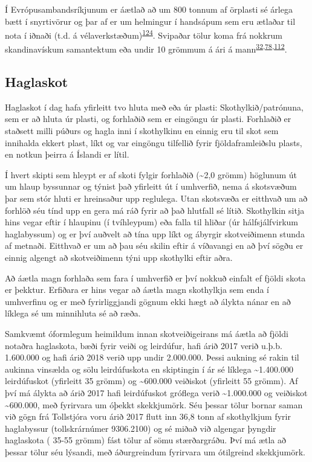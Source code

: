 \documentclass[icelandic,]{book}
\begin{document}
Í Evrópusambandsríkjunum er áætlað að um 800 tonnum af örplasti sé árlega bætt í snyrtivörur og þar af er um helmingur í handsápum sem eru ætlaðar til nota í iðnaði (t.d. á vélaverkstæðum)\textsuperscript{\protect\hyperlink{ref-Scudo2017}{124}}. Svipaðar tölur koma frá nokkrum skandinavískum samantektum eða undir 10 grömmum á ári á mann\textsuperscript{\protect\hyperlink{ref-sundt2014sources}{32},\protect\hyperlink{ref-lassen2015microplastics}{78},\protect\hyperlink{ref-magnusson2016swedish}{112}}.


\hypertarget{haglaskot}{%
\subsection*{Haglaskot}\label{haglaskot}}

Haglaskot í dag hafa yfirleitt tvo hluta með eða úr plasti: Skothylkið/patrónuna, sem er að hluta úr plasti, og forhlaðið sem er eingöngu úr plasti. Forhlaðið er staðsett milli púðurs og hagla inni í skothylkinu en einnig eru til skot sem innihalda ekkert plast, líkt og var eingöngu tilfellið fyrir fjöldaframleiðslu plasts, en notkun þeirra á Íslandi er lítil.

Í hvert skipti sem hleypt er af skoti fylgir forhlaðið (\textasciitilde{}2,0 grömm) höglunum út um hlaup byssunnar og týnist það yfirleitt út í umhverfið, nema á skotsvæðum þar sem stór hluti er hreinsaður upp reglulega. Utan skotsvæða er eitthvað um að forhlöð séu tínd upp en gera má ráð fyrir að það hlutfall sé lítið. Skothylkin sitja hins vegar eftir í hlaupinu (í tvíhleypum) eða falla til hliðar (úr hálfsjálfvirkum haglabyssum) og er því auðvelt að tína upp líkt og ábyrgir skotveiðimenn stunda af metnaði. Eitthvað er um að þau séu skilin eftir á víðavangi en að því sögðu er einnig algengt að skotveiðimenn týni upp skothylki eftir aðra.

Að áætla magn forhlaða sem fara í umhverfið er því nokkuð einfalt ef fjöldi skota er þekktur. Erfiðara er hins vegar að áætla magn skothylkja sem enda í umhverfinu og er með fyrirliggjandi gögnum ekki hægt að álykta nánar en að líklega sé um minnihluta sé að ræða.

Samkvæmt óformlegum heimildum innan skotveiðigeirans má áætla að fjöldi notaðra haglaskota, bæði fyrir veiði og leirdúfur, hafi árið 2017 verið u.þ.b. 1.600.000 og hafi árið 2018 verið upp undir 2.000.000. Þessi aukning sé rakin til aukinna vinsælda og sölu leirdúfuskota en skiptingin í ár sé líklega \textasciitilde{}1.400.000 leirdúfuskot (yfirleitt 35 grömm) og \textasciitilde{}600.000 veiðiskot (yfirleitt 55 grömm). Af því má álykta að árið 2017 hafi leirdúfuskot gróflega verið \textasciitilde{}1.000.000 og veiðiskot \textasciitilde{}600.000, með fyrirvara um óþekkt skekkjumörk. Séu þessar tölur bornar saman við gögn frá Tollstjóra voru árið 2017 flutt inn 36,8 tonn af skothylkjum fyrir haglabyssur (tollskrárnúmer 9306.2100) og sé miðað við algengar þyngdir haglaskota ( 35-55 grömm) fást tölur af sömu stærðargráðu. Því má ætla að þessar tölur séu lýsandi, með áðurgreindum fyrirvara um ótilgreind skekkjumörk.
\end{document}
